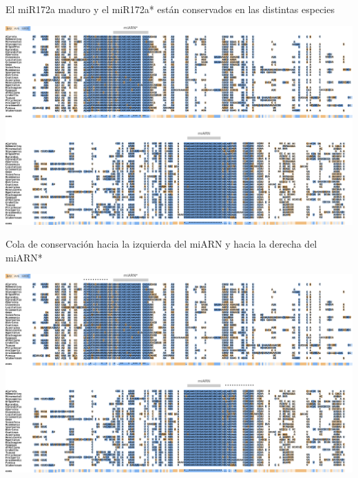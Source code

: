 \documentclass{beamer}
\begin{document}
\begin{frame}{El miR172a maduro y el miR172a* están conservados en las distintas especies}
	\begin{center}
		\includegraphics[width=1\textwidth]{img/miR172a_tcoffee_02.png}
	\end{center}
\end{frame}

\begin{frame}{Cola de conservación hacia la izquierda del miARN y hacia la derecha del miARN*}
	\begin{center}
		\includegraphics[width=1\textwidth]{img/miR172a_tcoffee_03.png}
	\end{center}
\end{frame}
\end{document}
